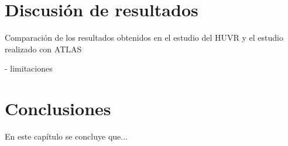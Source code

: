 \section{Discusión de resultados} \label{sec:09resultados}


Comparación de los resultados obtenidos en el estudio del HUVR y el estudio realizado con ATLAS

- limitaciones

\section{Conclusiones} \label{sec:09conclusiones}

En este capítulo se concluye que...